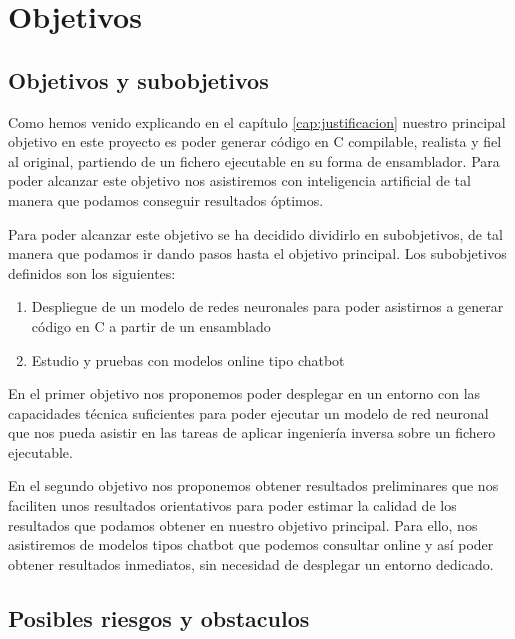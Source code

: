 \chapter{Objetivos}
\label{cap:objetivos}


\section{Objetivos y subobjetivos}
\label{sec:objetivos}


Como hemos venido explicando en el capítulo \ref{cap:justificacion} nuestro principal
objetivo en este proyecto es poder generar código en C compilable, realista y fiel
al original, partiendo de un fichero ejecutable en su forma de ensamblador. Para
poder alcanzar este objetivo nos asistiremos con inteligencia artificial de tal
manera que podamos conseguir resultados óptimos.

Para poder alcanzar este objetivo se ha decidido dividirlo en subobjetivos, de tal
manera que podamos ir dando pasos hasta el objetivo principal. Los subobjetivos definidos
son los siguientes:

\begin{enumerate}
    \item Despliegue de un modelo de redes neuronales para poder asistirnos a generar
        código en C a partir de un ensamblado
    \item Estudio y pruebas con modelos online tipo chatbot
\end{enumerate}

En el primer objetivo nos proponemos poder desplegar en un entorno con las capacidades
técnica suficientes para poder ejecutar un modelo de red neuronal que nos pueda asistir en
las tareas de aplicar ingeniería inversa sobre un fichero ejecutable.

En el segundo objetivo nos proponemos obtener resultados preliminares que nos faciliten
unos resultados orientativos para poder estimar la calidad de los resultados que podamos
obtener en nuestro objetivo principal. Para ello, nos asistiremos de modelos tipos chatbot
que podemos consultar online y así poder obtener resultados inmediatos, sin necesidad
de desplegar un entorno dedicado.

\section{Posibles riesgos y obstaculos}
\label{sec:riesgos}

